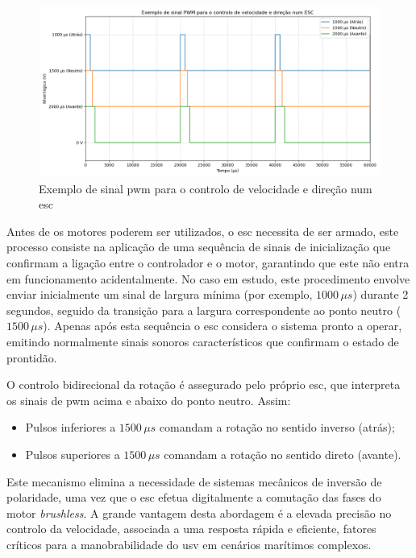 \begin{figure}[H]
    \centering
    \includegraphics[width=1\linewidth]{figuras/pwm_us.png}
    \caption{Exemplo de sinal \gls{pwm} para o controlo de velocidade e direção num \gls{esc}}
    \label{fig:pwm-sinal}
\end{figure}

Antes de os motores poderem ser utilizados, o \gls{esc} necessita de ser armado, este processo consiste na aplicação de uma sequência de sinais de inicialização que confirmam a ligação entre o controlador e o motor, garantindo que este não entra em funcionamento acidentalmente. No caso em estudo, este procedimento envolve enviar inicialmente um sinal de largura mínima (por exemplo, $1000\,\mu s$) durante 2 segundos, seguido da transição para a largura correspondente ao ponto neutro ($1500\,\mu s$). Apenas após esta sequência o \gls{esc} considera o sistema pronto a operar, emitindo normalmente sinais sonoros característicos que confirmam o estado de prontidão.

O controlo bidirecional da rotação é assegurado pelo próprio \gls{esc}, que interpreta os sinais de \gls{pwm} acima e abaixo do ponto neutro. Assim:

\begin{itemize}
    \item Pulsos inferiores a $1500\,\mu s$ comandam a rotação no sentido inverso (atrás);
    \item Pulsos superiores a $1500\,\mu s$ comandam a rotação no sentido direto (avante).
\end{itemize}

Este mecanismo elimina a necessidade de sistemas mecânicos de inversão de polaridade, uma vez que o \gls{esc} efetua digitalmente a comutação das fases do motor \emph{brushless}. A grande vantagem desta abordagem é a elevada precisão no controlo da velocidade, associada a uma resposta rápida e eficiente, fatores críticos para a manobrabilidade do \gls{usv} em cenários marítimos complexos.

